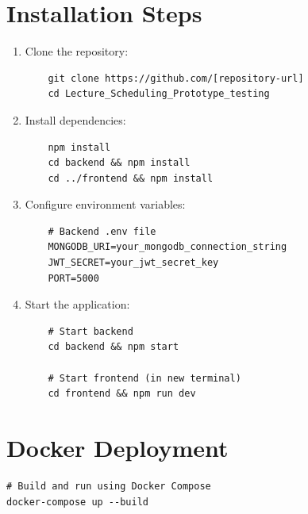 \documentclass[12pt,a4paper]{report}
\begin{document}
\section{Installation Steps}
\begin{enumerate}
    \item Clone the repository:
    \begin{verbatim}
    git clone https://github.com/[repository-url]
    cd Lecture_Scheduling_Prototype_testing
    \end{verbatim}
    
    \item Install dependencies:
    \begin{verbatim}
    npm install
    cd backend && npm install
    cd ../frontend && npm install
    \end{verbatim}
    
    \item Configure environment variables:
    \begin{verbatim}
    # Backend .env file
    MONGODB_URI=your_mongodb_connection_string
    JWT_SECRET=your_jwt_secret_key
    PORT=5000
    \end{verbatim}
    
    \item Start the application:
    \begin{verbatim}
    # Start backend
    cd backend && npm start
    
    # Start frontend (in new terminal)
    cd frontend && npm run dev
    \end{verbatim}
\end{enumerate}

\section{Docker Deployment}
\begin{verbatim}
# Build and run using Docker Compose
docker-compose up --build
\end{verbatim}
\end{document}

